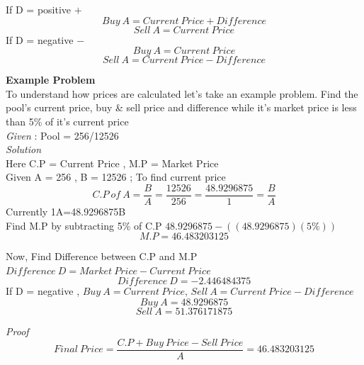 \documentclass[10pt]{article}
\begin{document}
If D = positive $+$
\begin{equation}
Buy\:A=Current\:Price+Difference
\end{equation}
\begin{equation}
Sell\:A=Current\:Price
\end{equation}
If D = negative $-$
\begin{equation}
Buy\:A=Current\:Price
\end{equation}
\begin{equation}
Sell\:A=Current\:Price-Difference
\end{equation}

\textbf{Example Problem}\\

To understand how prices are calculated let's take an example problem. Find the pool's current price, buy \& sell price and difference while it's market price is less than 5\% of it's current price\\

\textit{Given} : Pool = 256/12526\\

\textit{Solution}\\
Here C.P = Current Price , M.P = Market Price\\
Given A = 256 , B = 12526 ;
To find current price 
\begin{equation}
C.P\:of\:A=\frac{B}{A}=\frac{12526}{256}=\frac{48.9296875}{1}=\frac{B}{A}
\end{equation}
Currently 1A=48.9296875B\\

Find M.P by subtracting 5\% of C.P $48.9296875 - ((48.9296875)(5\%))$ \\
\begin{equation}
M.P = 46.483203125
\end{equation}

Now, Find Difference between C.P and M.P $Difference\:D = Market\:Price - Current\:Price$
\begin{equation}
Difference\:D = -2.446484375
\end{equation}
If D = negative , $Buy\:A=Current\:Price$, $Sell\:A=Current\:Price-Difference$
\begin{equation}
Buy\:A = 48.9296875
\end{equation}
\begin{equation}
Sell\:A = 51.376171875
\end{equation}

\textit{Proof}
\begin{equation}
Final\:Price=\frac{C.P+Buy\:Price - Sell\:Price}{A} = 46.483203125
\end{equation}\\
\end{document}
